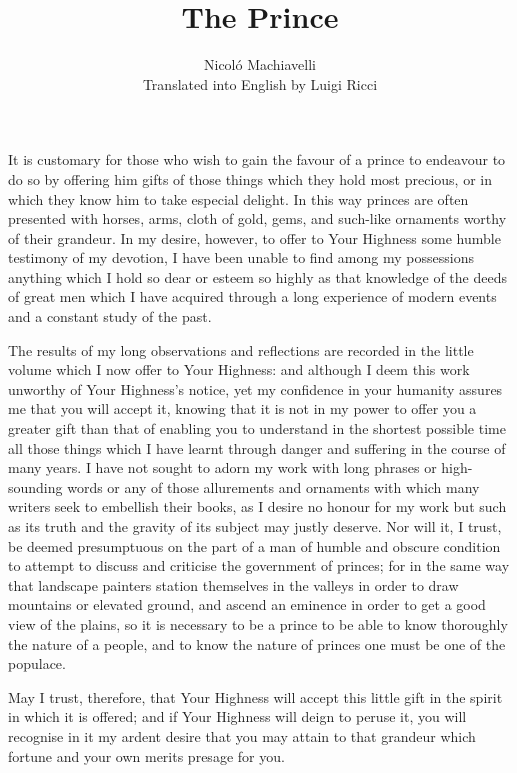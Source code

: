 \documentclass[12pt,letterpaper]{memoir}
\title{\textbf{The Prince}}
\author{%
Nicoló Machiavelli\\
Translated into English by Luigi Ricci}
\date{}
\begin{document}
\frontmatter
\maketitle
\tableofcontents
\mainmatter

It is customary for those who wish to gain the favour of a prince to
endeavour to do so by offering him gifts of those things which they
hold most precious, or in which they know him to take especial delight.
In this way princes are often presented with horses, arms, cloth of
gold, gems, and such-like ornaments worthy of their grandeur. In my
desire, however, to offer to Your Highness some humble testimony of
my devotion, I have been unable to find among my possessions anything
which I hold so dear or esteem so highly as that knowledge of the deeds
of great men which I have acquired through a long experience of modern
events and a constant study of the past.

The results of my long observations and reflections are recorded in the
little volume which I now offer to Your Highness: and although I deem
this work unworthy of Your Highness's notice, yet my confidence in your
humanity assures me that you will accept it, knowing that it is not
in my power to offer you a greater gift than that of enabling you to
understand in the shortest possible time all those things which I have
learnt through danger and suffering in the course of many years. I have
not sought to adorn my work with long phrases or high-sounding words or
any of those allurements and ornaments with which many writers seek to
embellish their books, as I desire no honour for my work but such as
its truth and the gravity of its subject may justly deserve. Nor will
it, I trust, be deemed presumptuous on the part of a man of humble and
obscure condition to attempt to discuss and criticise the government of
princes; for in the same way that landscape painters station themselves
in the valleys in order to draw mountains or elevated ground, and
ascend an eminence in order to get a good view of the plains, so it
is necessary to be a prince to be able to know thoroughly the nature
of a people, and to know the nature of princes one must be one of the
populace.

May I trust, therefore, that Your Highness will accept this little gift
in the spirit in which it is offered; and if Your Highness will deign
to peruse it, you will recognise in it my ardent desire that you may
attain to that grandeur which fortune and your own merits presage for
you.
\end{document}
